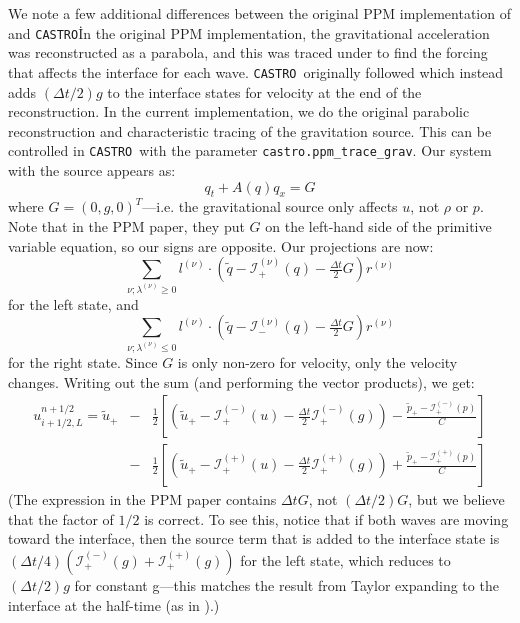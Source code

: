 \documentclass[iop]{../emulateapj}
\newcommand{\evm}{{(-)}}
\newcommand{\evp}{{(+)}}
\newcommand{\enu}{{(\nu)}}
\newcommand{\castro}{\texttt{CASTRO}}
\begin{document}
We note a few additional differences between the original PPM
implementation of \citet{ppm} and \castro\.  In the original PPM
implementation, the gravitational acceleration was reconstructed as a parabola, and
this was traced under to find the forcing that affects the interface
for each wave.  \castro\ originally followed \citet{ppmunsplit} which instead adds
$(\Delta t/2)g$ to the interface states for velocity at the end of the
reconstruction.  In the current implementation, we do the original
parabolic reconstruction and characteristic tracing of the gravitation
source. This can be controlled in \castro\ with the parameter 
{\tt castro.ppm\_trace\_grav}. Our system with the source appears as:
\begin{equation}
q_t + A(q) q_x = G
\end{equation}
where $G = (0, g, 0)^T$---i.e. the gravitational source only affects
$u$, not $\rho$ or $p$.  Note that in the PPM paper, they put $G$ on 
the left-hand side of the primitive variable equation, so our signs are
opposite.  Our projections are now:
\begin{equation}
\sum_{\nu; \lambda^\enu \ge 0}l^\enu \cdot (\tilde{q} - \mathcal{I}^\enu_+(q) - \tfrac{\Delta t}{2} G) r^\enu
\end{equation}
for the left state, and
\begin{equation}
\sum_{\nu; \lambda^\enu \le 0} l^\enu \cdot (\tilde{q} - \mathcal{I}^\enu_-(q) - \tfrac{\Delta t}{2} G) r^\enu 
\end{equation}
for the right state.  Since $G$ is only non-zero for velocity, only
the velocity changes.  Writing out the sum (and performing the vector products), we
get:
\begin{eqnarray}
u_{i+1/2,L}^{n+1/2} =
   \tilde{u}_+ 
  &-& \frac{1}{2} \left [
      \left (\tilde{u}_+ - \mathcal{I}_+^\evm(u) - \frac{\Delta t}{2} \mathcal{I}^\evm_+(g) \right ) - 
       \frac{\tilde{p}_+ - \mathcal{I}_+^\evm(p)}{C} \right ] \nonumber \\
  &-& \frac{1}{2} \left [
      \left (\tilde{u}_+ - \mathcal{I}_+^\evp(u) - \frac{\Delta t}{2} \mathcal{I}^\evp_+(g) \right ) +
       \frac{\tilde{p}_+ - \mathcal{I}_+^\evp(p)}{C} \right ]
\end{eqnarray}
(The expression in the PPM paper contains $\Delta t G$, not $(\Delta t/2) G$,
but we believe that the factor of $1/2$ is correct.  To see this, notice that if both
waves are moving toward the interface, then the source term that is
added to the interface state is $(\Delta t/4) (\mathcal{I}_+^\evm(g) +
\mathcal{I}_+^\evp(g))$ for the left state, which reduces to $(\Delta
t/2) g$ for constant g---this matches the result from Taylor
expanding to the interface at the half-time (as in \citealt{ppmunsplit}).)
\end{document}
